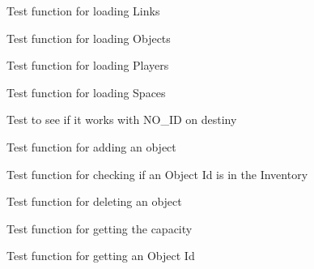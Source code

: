 \begin{DoxyRefList}
\item[\label{test__test000025}%
\hypertarget{test__test000025}{}%
Member \hyperlink{game__reader__test_8h_afc966d5568703a54eee14a68793ce60d}{test3\+\_\+game\+\_\+reader\+\_\+load\+\_\+links} ()]Test function for loading Links  
\item[\label{test__test000021}%
\hypertarget{test__test000021}{}%
Member \hyperlink{game__reader__test_8h_a4931f3cc77f25530c60aa5494c907e2a}{test3\+\_\+game\+\_\+reader\+\_\+load\+\_\+objects} ()]Test function for loading Objects  
\item[\label{test__test000017}%
\hypertarget{test__test000017}{}%
Member \hyperlink{game__reader__test_8h_a8d8ffd614a258aec0e2c73172ccc7479}{test3\+\_\+game\+\_\+reader\+\_\+load\+\_\+players} ()]Test function for loading Players  
\item[\label{test__test000013}%
\hypertarget{test__test000013}{}%
Member \hyperlink{game__reader__test_8h_a0a1d062789f3432e3060193f5268b5dd}{test3\+\_\+game\+\_\+reader\+\_\+load\+\_\+spaces} ()]Test function for loading Spaces  
\item[\label{test__test000075}%
\hypertarget{test__test000075}{}%
Member \hyperlink{game__test_8h_a2eb1b65a3a2adf0a890377debabbf265}{test3\+\_\+game\+\_\+set\+\_\+object\+\_\+location} ()]Test to see if it works with N\+O\+\_\+\+ID on destiny  
\item[\label{test__test000095}%
\hypertarget{test__test000095}{}%
Member \hyperlink{inventory__test_8h_ada5ad194dfe9af537c6b2805bf38910d}{test3\+\_\+inventory\+\_\+add} ()]Test function for adding an object  
\item[\label{test__test000116}%
\hypertarget{test__test000116}{}%
Member \hyperlink{inventory__test_8h_a4f88e37d67c69f990b82b135f5c1f9f9}{test3\+\_\+inventory\+\_\+check\+\_\+object} ()]Test function for checking if an Object Id is in the Inventory  
\item[\label{test__test000099}%
\hypertarget{test__test000099}{}%
Member \hyperlink{inventory__test_8h_a063d13c3dbc32094f20fe98ca0c6c357}{test3\+\_\+inventory\+\_\+del} ()]Test function for deleting an object  
\item[\label{test__test000113}%
\hypertarget{test__test000113}{}%
Member \hyperlink{inventory__test_8h_aee11f25fc989fa8d62b5115f30b48edc}{test3\+\_\+inventory\+\_\+get\+\_\+max\+\_\+objects} ()]Test function for getting the capacity  
\item[\label{test__test000107}%
\hypertarget{test__test000107}{}%
Member \hyperlink{inventory__test_8h_af4188f35f25167e033fab87480f69c72}{test3\+\_\+inventory\+\_\+get\+\_\+object\+\_\+id} ()]Test function for getting an Object Id  

\end{DoxyRefList}
